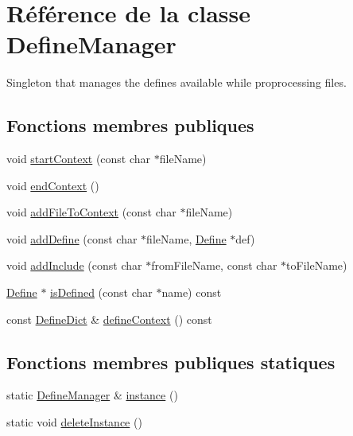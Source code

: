 \hypertarget{class_define_manager}{}\section{Référence de la classe Define\+Manager}
\label{class_define_manager}


Singleton that manages the defines available while proprocessing files.  


\subsection*{Fonctions membres publiques}
\begin{DoxyCompactItemize}
\item 
void \hyperlink{class_define_manager_afbecee8baeba40d35a068f7f3e53fe3e}{start\+Context} (const char $\ast$file\+Name)
\item 
void \hyperlink{class_define_manager_aee1f4c46242ef774c2bb68fb546df57d}{end\+Context} ()
\item 
void \hyperlink{class_define_manager_a9398543779e313d7fee799d200d2054b}{add\+File\+To\+Context} (const char $\ast$file\+Name)
\item 
void \hyperlink{class_define_manager_add50ce745af761cdf1d05428855ada2c}{add\+Define} (const char $\ast$file\+Name, \hyperlink{class_define}{Define} $\ast$def)
\item 
void \hyperlink{class_define_manager_ad7fc54954b0c4e8896354bcf5449c188}{add\+Include} (const char $\ast$from\+File\+Name, const char $\ast$to\+File\+Name)
\item 
\hyperlink{class_define}{Define} $\ast$ \hyperlink{class_define_manager_a8d91b4cd399f920046c4144d95c7c823}{is\+Defined} (const char $\ast$name) const 
\item 
const \hyperlink{src_2define_8h_a10f99e0f6f8522fa4cf1e7e4ff485f35}{Define\+Dict} \& \hyperlink{class_define_manager_a175bc8197c677fee9cfba6ce307225a9}{define\+Context} () const 
\end{DoxyCompactItemize}
\subsection*{Fonctions membres publiques statiques}
\begin{DoxyCompactItemize}
\item 
static \hyperlink{class_define_manager}{Define\+Manager} \& \hyperlink{class_define_manager_abadbf233461748c2d5f037874c58c375}{instance} ()
\item 
static void \hyperlink{class_define_manager_ad3ccd619d92e9bd8e7e7357c6db68cbb}{delete\+Instance} ()
\end{DoxyCompactItemize}
